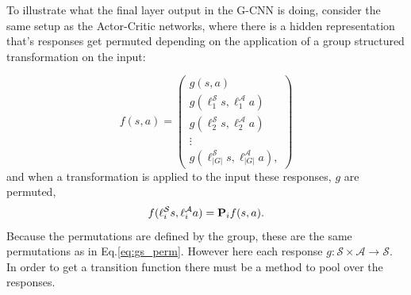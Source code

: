 To illustrate what the final layer output in the G-CNN is doing, consider the same setup as the Actor-Critic networks, where there is a hidden representation that's responses get permuted depending on the application of a group structured transformation on the input:

\begin{equation}
	f(s , a) = \begin{pmatrix}
		g(s, a)                                     \\
		g(\ell_1^\mathcal{S}s,\ell^\mathcal{A}_1a)  \\
		g(\ell^\mathcal{S}_2s, \ell^\mathcal{A}_2a) \\
		\vdots                                      \\
		g(\ell_{|G|}^\mathcal{S}s, \ell^\mathcal{A}_{|G|}a),
	\end{pmatrix}
\end{equation}
and when a transformation is applied to the input these responses, $g$ are permuted,
\begin{equation}\label{eq:tm_gcnn}
	f(\ell_i^\mathcal{S}s, \ell_i^\mathcal{A}a) = \mathbf{P}_i f(s, a).
\end{equation}
Because the permutations are defined by the group, these are the same permutations as in Eq.\ref{eq:gs_perm}. However here each response $g: \mathcal{S} \times \mathcal{A} \rightarrow \mathcal{S}$. In order to get a transition function there must be a method to pool over the responses.

